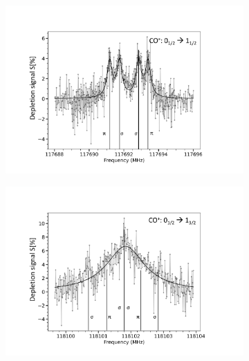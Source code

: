\begin{figure}[!htb]
    \centering
    \begin{subfigure}[b]{0.49\textwidth}
        \centering
        \includegraphics[width=1\textwidth]{chapters/CO+_ROSAA_paper/117_CO+_fig.pdf}
        \caption{}
        \label{fig:117}
    \end{subfigure}
    \hfill
    \begin{subfigure}[b]{0.49\textwidth}
        \centering
        \includegraphics[width=1\textwidth]{chapters/CO+_ROSAA_paper/118_CO+_fig.pdf}
        \caption{}
        \label{fig:118}
    \end{subfigure}
    \hfill
    \begin{subfigure}[b]{0.49\textwidth}
        \centering

\end{subfigure}
\end{figure}
